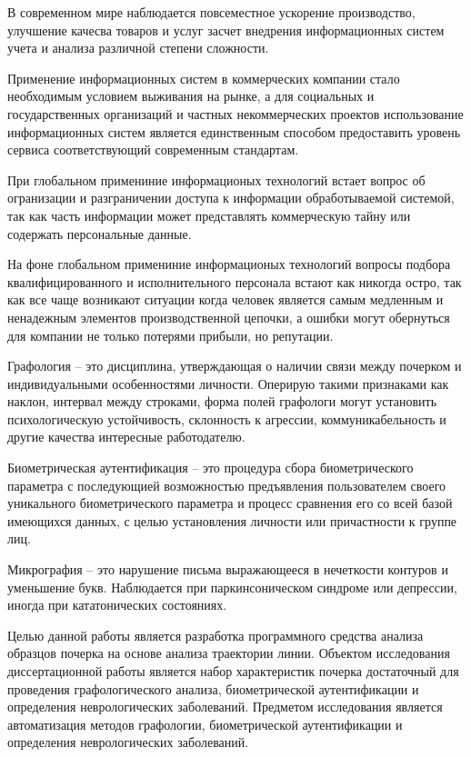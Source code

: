 \label{sec:intro}

В современном мире наблюдается повсеместное ускорение производство, улучшение качесва товаров и услуг засчет внедрения информационных систем учета и анализа различной степени сложности.

Применение информационных систем в коммерческих компании стало необходимым условием выживания на рынке, а для социальных и государственных организаций и частных некоммерческих проектов использование информационных систем является единственным способом предоставить уровень сервиса соответствующий современным стандартам. 

При глобальном примениние информационых технологий встает вопрос об огранизации и разграничении доступа к информации обработываемой системой, так как часть информации может представлять коммерческую тайну или содержать персональные данные.

На фоне глобальном примениние информационых технологий вопросы подбора квалифицированного и исполнительного персонала встают как никогда остро, так как все чаще возникают ситуации когда человек является самым медленным и ненадежным элементов производственной цепочки, а ошибки могут обернуться для компании не только потерями прибыли, но репутации.

Графология -- это дисциплина, утверждающая о наличии связи между почерком и индивидуальными особенностями личности. Оперирую такими признаками как наклон, интервал между строками, форма полей графологи могут установить психологическую устойчивость, склонность к агрессии, коммуникабельность и другие качества интересные работодателю.

Биометрическая аутентификация -- это процедура сбора биометрического параметра с последующией возможностью предъявления пользователем своего уникального биометрического параметра и процесс сравнения его со всей базой имеющихся данных, с целью установления личности или причастности к группе лиц.

Микрография -- это нарушение письма выражающееся в нечеткости контуров и уменьшение букв. Наблюдается при паркинсоническом синдроме или депрессии, иногда при кататонических состояниях.

Целью данной работы является разработка программного средства анализа образцов почерка на основе анализа траектории линии.
Объектом исследования диссертационной работы является набор характеристик почерка достаточный для проведения графологического анализа, биометрической аутентификации и определения неврологических заболеваний.
Предметом исследования является автоматизация методов графологии, биометрической аутентификации и определения неврологических заболеваний.

